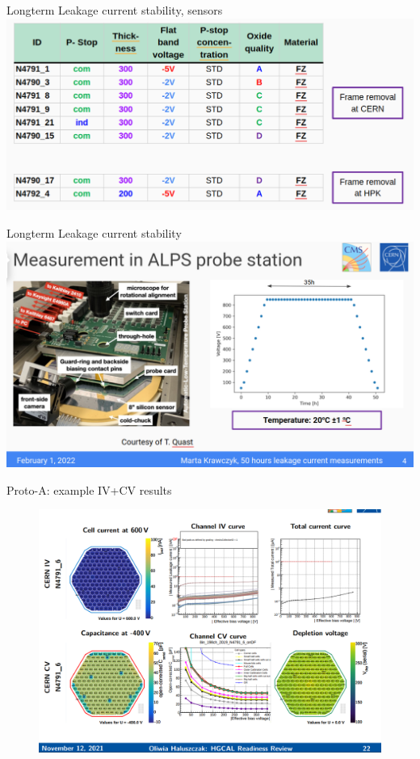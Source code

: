 \documentclass{beamer}
\begin{document}
\begin{frame}{Longterm Leakage current stability, sensors}
  \includegraphics[width=.9\textwidth]{plots/Longterm_sensors.png}
\end{frame}

\begin{frame}{Longterm Leakage current stability}
  \includegraphics[width=.7\textwidth]{plots/Longterm_process.png}
\end{frame}

\begin{frame}{Proto-A: example IV+CV results}
    \begin{figure}
  \includegraphics[width=.8\textwidth]{plots/IV_CV_example.png}
        
    \end{figure}
\end{frame}
\end{document}
